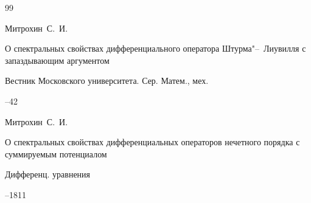 \begin{thebibliography}{99}

\by Митрохин~С.~И.

\paper О спектральных свойствах дифференциального оператора Штурма"--~Лиувилля с запаздывающим аргументом

\jour Вестник Московского университета. Сер. Матем., мех.



--42




\by Митрохин~С.~И.

\paper О спектральных свойствах дифференциальных операторов нечетного порядка с суммируемым потенциалом 

\jour Дифференц. уравнения




--1811



\end{thebibliography}







\newpage







\makeentitle












\newpage

